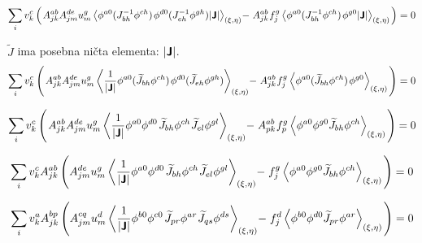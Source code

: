 \begin{equation}
   \sum_i v^c_k \left( \mkern2mu A^{ab}_{jk} A^{de}_{jm} u^g_m \left\langle\phi^{a0} (J^{-1}_{bh}  \phi^{ch}) \mkern1mu\mkern1mu \phi^{d0} (J^{-1}_{eh}  \phi^{gh}) |\bm{\mathsf{J}}|\right\rangle_{(\xi, \eta)} \mkern-4mu - \mkern1mu A^{ab}_{jk} \mkern1mu f^g_j \left\langle\phi^{a0} (J^{-1}_{bh}  \phi^{ch}) \mkern1mu \mkern1mu \phi^{g0} |\bm{\mathsf{J}}|\right\rangle_{(\xi, \eta)} \mkern2mu \right) = 0
\end{equation}

$\widetilde{J}$ ima posebna ničta elementa: $|\bm{\mathsf{J}}|$.
\begin{equation}
   \sum_i v^c_k \left( \mkern2mu A^{ab}_{jk} A^{de}_{jm} u^g_m \left\langle \frac{1}{|\bm{\mathsf{J}}|} \phi^{a0} (\widetilde{J}_{bh}  \phi^{ch}) \mkern1mu\mkern1mu \phi^{d0} (\widetilde{J}_{eh}  \phi^{gh}) \right\rangle_{(\xi, \eta)} \mkern-4mu - \mkern1mu A^{ab}_{jk} \mkern1mu f^g_j \left\langle\phi^{a0} (\widetilde{J}_{bh}  \phi^{ch}) \mkern1mu \mkern1mu \phi^{g0} \right\rangle_{(\xi, \eta)} \mkern2mu \right) = 0
\end{equation}

\begin{equation}
   \sum_i v^c_k \left( \mkern2mu A^{ab}_{jk} A^{de}_{jm} u^g_m \left\langle \frac{1}{|\bm{\mathsf{J}}|} \phi^{a0} \phi^{d0} \mkern2mu \widetilde{J}_{bh}  \phi^{ch} \mkern1mu \widetilde{J}_{el}  \phi^{gl} \right\rangle_{(\xi, \eta)} \mkern-4mu - \mkern1mu A^{ab}_{pk} \mkern1mu f^g_p \left\langle\phi^{a0} \phi^{g0} \widetilde{J}_{bh}  \phi^{ch} \right\rangle_{(\xi, \eta)} \mkern2mu \right) = 0
\end{equation}

\begin{equation}
   \sum_i v^c_k A^{ab}_{jk} \left(A^{de}_{jm} u^g_m \left\langle \frac{1}{|\bm{\mathsf{J}}|} \phi^{a0} \phi^{d0} \mkern2mu \widetilde{J}_{bh}  \phi^{ch} \mkern1mu \widetilde{J}_{el}  \phi^{gl} \right\rangle_{(\xi, \eta)} \mkern-4mu - \mkern1mu f^g_j \left\langle\phi^{a0} \phi^{g0} \widetilde{J}_{bh}  \phi^{ch} \right\rangle_{(\xi, \eta)} \mkern2mu \right) = 0
\end{equation}

\begin{equation}
   \sum_i v^a_k A^{bp}_{jk} \left(A^{cq}_{jm} u^d_m \left\langle \frac{1}{|\bm{\mathsf{J}}|} \phi^{b0} \phi^{c0} \mkern2mu \widetilde{J}_{pr}  \phi^{ar} \mkern1mu \widetilde{J}_{qs}  \phi^{ds} \right\rangle_{(\xi, \eta)} \mkern-4mu - \mkern1mu f^d_j \left\langle\phi^{b0} \phi^{d0} \widetilde{J}_{pr}  \phi^{ar} \right\rangle_{(\xi, \eta)} \mkern2mu \right) = 0
\end{equation}

